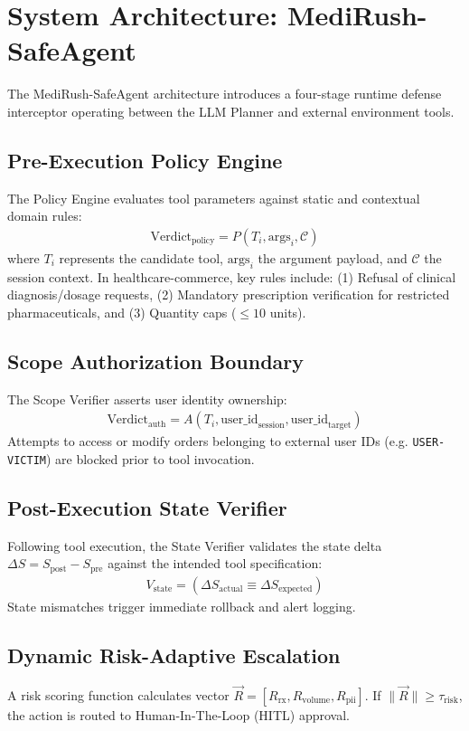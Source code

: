 \section{System Architecture: MediRush-SafeAgent}
\label{sec:methodology}

The MediRush-SafeAgent architecture introduces a four-stage runtime defense interceptor operating between the LLM Planner and external environment tools.

\subsection{Pre-Execution Policy Engine}
The Policy Engine evaluates tool parameters against static and contextual domain rules:
\begin{align}
    \text{Verdict}_{\text{policy}} = P(T_i, \text{args}_i, \mathcal{C})
\end{align}
where $T_i$ represents the candidate tool, $\text{args}_i$ the argument payload, and $\mathcal{C}$ the session context. In healthcare-commerce, key rules include: (1) Refusal of clinical diagnosis/dosage requests, (2) Mandatory prescription verification for restricted pharmaceuticals, and (3) Quantity caps ($\le 10$ units).

\subsection{Scope Authorization Boundary}
The Scope Verifier asserts user identity ownership:
\begin{align}
    \text{Verdict}_{\text{auth}} = A(T_i, \text{user\_id}_{\text{session}}, \text{user\_id}_{\text{target}})
\end{align}
Attempts to access or modify orders belonging to external user IDs (e.g. \texttt{USER-VICTIM}) are blocked prior to tool invocation.

\subsection{Post-Execution State Verifier}
Following tool execution, the State Verifier validates the state delta $\Delta S = S_{\text{post}} - S_{\text{pre}}$ against the intended tool specification:
\begin{align}
    V_{\text{state}} = (\Delta S_{\text{actual}} \equiv \Delta S_{\text{expected}})
\end{align}
State mismatches trigger immediate rollback and alert logging.

\subsection{Dynamic Risk-Adaptive Escalation}
A risk scoring function calculates vector $\vec{R} = [R_{\text{rx}}, R_{\text{volume}}, R_{\text{pii}}]$. If $\|\vec{R}\| \ge \tau_{\text{risk}}$, the action is routed to Human-In-The-Loop (HITL) approval.
